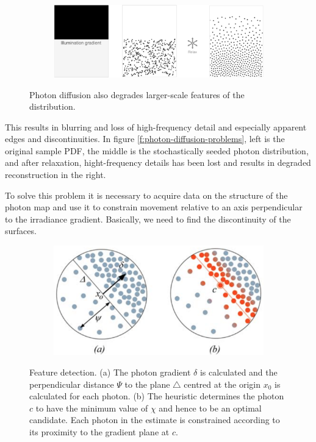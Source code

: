 \begin{figure}\label{f:photon-diffusion-problems}
\begin{center}
	\begin{subfigure}[b]{1.\textwidth}
		\includegraphics[width=1.0\textwidth]{graphics/pm/pm-16-1}
	\end{subfigure}
\end{center}
\caption{Photon diffusion also degrades larger-scale features of the distribution.}
\end{figure}

This results in blurring and loss of high-frequency detail and especially apparent edges and discontinuities. In figure \ref{f:photon-diffusion-problems}, left is the original sample PDF, the middle is the stochastically seeded photon distribution, and after relaxation,  hight-frequency details has been lost and results in degraded reconstruction in the right.

To solve this problem it is necessary to acquire data on the structure of the photon map and use it to constrain movement relative to an axis perpendicular to the irradiance gradient. Basically, we need to find the discontinuity of the surfaces.

\begin{figure}\label{f:photon-feature-detection}
\begin{center}
	\begin{subfigure}[b]{0.6\textwidth}
		\includegraphics[width=1.0\textwidth]{graphics/pm/pm-16-4}
	\end{subfigure}
\end{center}
\caption{Feature detection. (a) The photon gradient $\delta$ is calculated and the perpendicular distance $\Psi$ to the plane $\triangle$ centred at the origin $x_0$ is calculated for each photon. (b) The heuristic determines the photon $c$ to have the minimum value of $\chi$ and hence to be an optimal candidate. Each photon in the estimate is constrained according to its proximity to the gradient plane at $c$.}
\end{figure}

